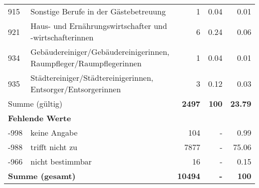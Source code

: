 \begin{longtable}{lXrrr}
        915 & \multicolumn{1}{X}{Sonstige Berufe in der Gästebetreuung} & %
          \num{1} &
          \num[round-mode=places,round-precision=2]{0.04} &
          \num[round-mode=places,round-precision=2]{0.01} \\

        921 & \multicolumn{1}{X}{Haus- und Ernährungswirtschafter und -wirtschafterinnen} & %
          \num{6} &
          \num[round-mode=places,round-precision=2]{0.24} &
          \num[round-mode=places,round-precision=2]{0.06} \\

        934 & \multicolumn{1}{X}{Gebäudereiniger/Gebäudereinigerinnen, Raumpfleger/Raumpflegerinnen} & %
          \num{1} &
          \num[round-mode=places,round-precision=2]{0.04} &
          \num[round-mode=places,round-precision=2]{0.01} \\

        935 & \multicolumn{1}{X}{Städtereiniger/Städtereinigerinnen, Entsorger/Entsorgerinnen} & %
          \num{3} &
          \num[round-mode=places,round-precision=2]{0.12} &
          \num[round-mode=places,round-precision=2]{0.03} \\

     \midrule
     \multicolumn{2}{l}{Summe (gültig)} &
       \textbf{\num{2497}} &
     \textbf{\num{100}} &
       \textbf{\num[round-mode=places,round-precision=2]{23.79}} \\
     \multicolumn{5}{l}{\textbf{Fehlende Werte}}\\
       -998 &
       keine Angabe &
         \num{104} &
        - &
         \num[round-mode=places,round-precision=2]{0.99} \\
       -988 &
       trifft nicht zu &
         \num{7877} &
        - &
         \num[round-mode=places,round-precision=2]{75.06} \\
       -966 &
       nicht bestimmbar &
         \num{16} &
        - &
         \num[round-mode=places,round-precision=2]{0.15} \\
     \midrule
     \multicolumn{2}{l}{\textbf{Summe (gesamt)}} &
          \textbf{\num{10494}} &
        \textbf{-} &
        \textbf{\num{100}} \\
     \bottomrule
     \end{longtable}
     
